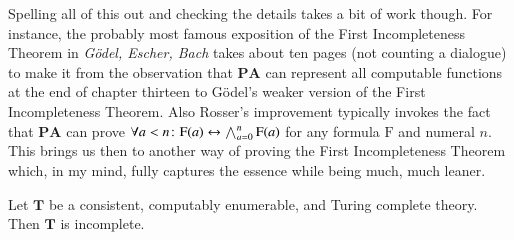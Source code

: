 \documentclass{article}
\theoremstyle{customstyle}
\newcommand{\T}{\mathbf{T}}
\newcommand{\PA}{\mathbf{PA}}
\let\S\relax
\newcommand{\S}{\text{S}}
\begin{document}
Spelling all of this out and checking the details takes a bit of work though. For instance, the probably most famous exposition of the First Incompleteness Theorem in \textit{Gödel, Escher, Bach} takes about ten pages (not counting a dialogue) to make it from the observation that $\PA$ can represent all computable functions at the end of chapter thirteen to Gödel's weaker version of the First Incompleteness Theorem. Also Rosser's improvement typically invokes the fact that $\PA$ can prove $\forall a < \S n \colon \mathrm{F}(a) \leftrightarrow \bigwedge_{a=0}^n \mathrm{F}(a)$ for any formula $\mathrm{F}$ and numeral $n$. This brings us then to another way of proving the First Incompleteness Theorem which, in my mind, fully captures the essence while being much, much leaner.

\begin{theorem}\label{tm-first}
Let $\T$ be a consistent, computably enumerable, and Turing complete theory. Then $\T$ is incomplete.
\end{theorem}
\end{document}
